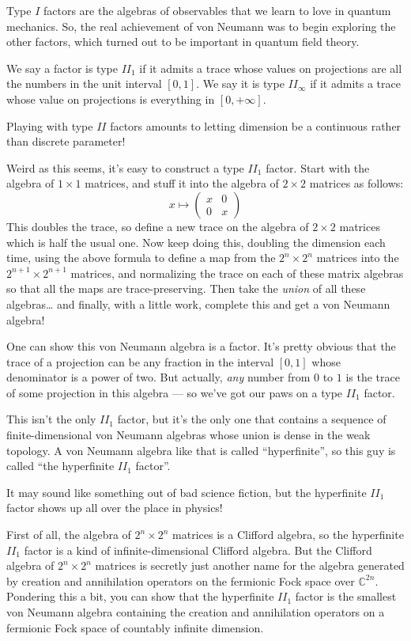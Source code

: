\documentclass{article}
\begin{document}
Type \(I\) factors are the algebras of observables that we learn to love
in quantum mechanics. So, the real achievement of von Neumann was to
begin exploring the other factors, which turned out to be important in
quantum field theory.

We say a factor is type \(II_1\) if it admits a trace whose values on
projections are all the numbers in the unit interval \([0,1]\). We say
it is type \(II_\infty\) if it admits a trace whose value on projections
is everything in \([0,+\infty]\).

Playing with type \(II\) factors amounts to letting dimension be a
continuous rather than discrete parameter!

Weird as this seems, it's easy to construct a type \(II_1\) factor.
Start with the algebra of \(1\times1\) matrices, and stuff it into the
algebra of \(2\times2\) matrices as follows:
\[x\mapsto\left(\begin{array}{cc}x&0\\0&x\end{array}\right)\] This
doubles the trace, so define a new trace on the algebra of \(2\times2\)
matrices which is half the usual one. Now keep doing this, doubling the
dimension each time, using the above formula to define a map from the
\(2^n\times2^n\) matrices into the \(2^{n+1}\times2^{n+1}\) matrices,
and normalizing the trace on each of these matrix algebras so that all
the maps are trace-preserving. Then take the \emph{union} of all these
algebras\ldots{} and finally, with a little work, complete this and get
a von Neumann algebra!

One can show this von Neumann algebra is a factor. It's pretty obvious
that the trace of a projection can be any fraction in the interval
\([0,1]\) whose denominator is a power of two. But actually, \emph{any}
number from \(0\) to \(1\) is the trace of some projection in this
algebra --- so we've got our paws on a type \(II_1\) factor.

This isn't the only \(II_1\) factor, but it's the only one that contains
a sequence of finite-dimensional von Neumann algebras whose union is
dense in the weak topology. A von Neumann algebra like that is called
``hyperfinite'', so this guy is called ``the hyperfinite \(II_1\)
factor''.

It may sound like something out of bad science fiction, but the
hyperfinite \(II_1\) factor shows up all over the place in physics!

First of all, the algebra of \(2^n\times2^n\) matrices is a Clifford
algebra, so the hyperfinite \(II_1\) factor is a kind of
infinite-dimensional Clifford algebra. But the Clifford algebra of
\(2^n\times2^n\) matrices is secretly just another name for the algebra
generated by creation and annihilation operators on the fermionic Fock
space over \(\mathbb{C}^{2n}\). Pondering this a bit, you can show that
the hyperfinite \(II_1\) factor is the smallest von Neumann algebra
containing the creation and annihilation operators on a fermionic Fock
space of countably infinite dimension.
\end{document}
